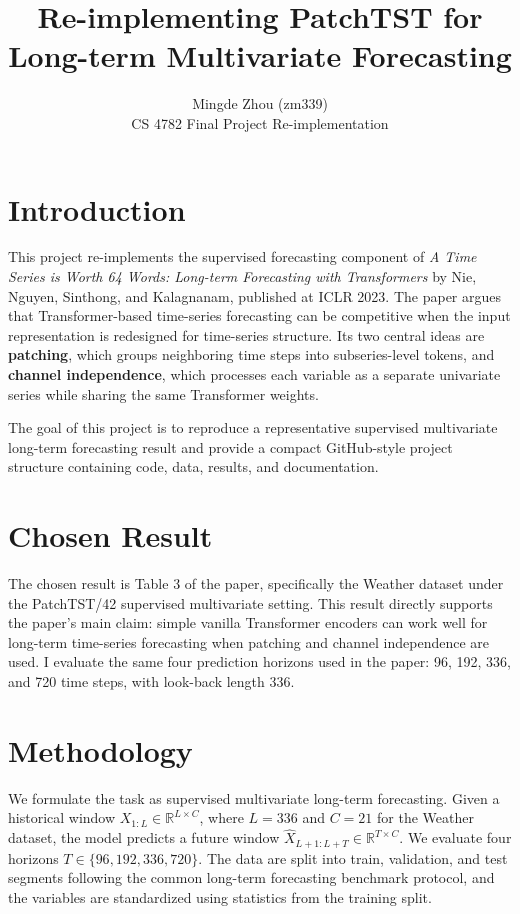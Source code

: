 \documentclass[11pt]{article}
\title{\vspace{-1.2em}\textbf{Re-implementing PatchTST for Long-term Multivariate Forecasting}}
\author{Mingde Zhou (zm339) \\ CS 4782 Final Project Re-implementation}
\date{}
\begin{document}
\maketitle
\vspace{-1.4em}

\section{Introduction}

This project re-implements the supervised forecasting component of \textit{A Time Series is Worth 64 Words: Long-term Forecasting with Transformers} by Nie, Nguyen, Sinthong, and Kalagnanam, published at ICLR 2023. The paper argues that Transformer-based time-series forecasting can be competitive when the input representation is redesigned for time-series structure. Its two central ideas are \textbf{patching}, which groups neighboring time steps into subseries-level tokens, and \textbf{channel independence}, which processes each variable as a separate univariate series while sharing the same Transformer weights.

The goal of this project is to reproduce a representative supervised multivariate long-term forecasting result and provide a compact GitHub-style project structure containing code, data, results, and documentation.

\section{Chosen Result}

The chosen result is Table 3 of the paper, specifically the Weather dataset under the PatchTST/42 supervised multivariate setting. This result directly supports the paper's main claim: simple vanilla Transformer encoders can work well for long-term time-series forecasting when patching and channel independence are used. I evaluate the same four prediction horizons used in the paper: 96, 192, 336, and 720 time steps, with look-back length 336.

\section{Methodology}

We formulate the task as supervised multivariate long-term forecasting. Given a historical window \(X_{1:L} \in \mathbb{R}^{L \times C}\), where \(L=336\) and \(C=21\) for the Weather dataset, the model predicts a future window \(\hat{X}_{L+1:L+T} \in \mathbb{R}^{T \times C}\). We evaluate four horizons \(T \in \{96, 192, 336, 720\}\). The data are split into train, validation, and test segments following the common long-term forecasting benchmark protocol, and the variables are standardized using statistics from the training split.
\end{document}
